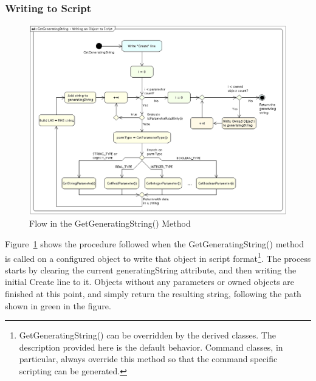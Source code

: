 \subsubsection{Writing to Script}

\begin{figure}[htb]
\begin{center}
\includegraphics[scale=0.5]
{./Images/GetGeneratingStringWritinganObjecttoScript.eps}
\caption{\label{figure:GetGeneratingStringDetails}Flow in the GetGeneratingString() Method}
\end{center}
\end{figure}

Figure~\ref{figure:GetGeneratingStringDetails} shows the procedure followed when the
GetGeneratingString() method is called on a configured object to write that object in script
format\footnote{GetGeneratingString() can be overridden by the derived classes.  The description
provided here is the default behavior.  Command classes, in particular, always override this
method so that the command specific scripting can be generated.}. The process starts by clearing the
current generatingString attribute, and then writing the initial Create line to it.  Objects
without any parameters or owned objects are finished at this point, and simply return the resulting
string, following the path shown in green in the figure.

